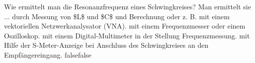     {Wie ermittelt man die Resonanzfrequenz eines Schwingkreises? Man ermittelt sie ...}
    {durch Messung von \$L\$ und \$C\$ und Berechnung oder z. B. mit einem vektoriellen Netzwerkanalysator (VNA).}
    {mit einem Frequenzmesser oder einem Oszilloskop.}
    {mit einem Digital-Multimeter in der Stellung Frequenzmessung.}
    {mit Hilfe der S-Meter-Anzeige bei Anschluss des Schwingkreises an den Empfängereingang.}
    {false}{false}